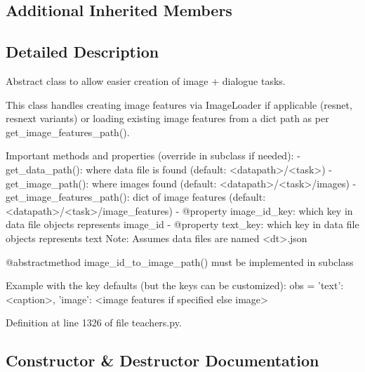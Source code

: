 \subsection*{Additional Inherited Members}


\subsection{Detailed Description}
\begin{DoxyVerb}Abstract class to allow easier creation of image + dialogue tasks.

This class handles creating image features via ImageLoader if applicable
(resnet, resnext variants) or loading existing image features from a dict
path as per get_image_features_path().

Important methods and properties (override in subclass if needed):
- get_data_path(): where data file is found (default: <datapath>/<task>)
- get_image_path(): where images found (default: <datapath>/<task>/images)
- get_image_features_path(): dict of image features (default:
  <datapath>/<task>/image_features)
- @property image_id_key: which key in data file objects represents image_id
- @property text_key: which key in data file objects represents text
Note: Assumes data files are named <dt>.json

@abstractmethod image_id_to_image_path() must be implemented in
subclass

Example with the key defaults (but the keys can be customized):
obs = {'text': <caption>,
    'image': <image features if specified else image>
    }
\end{DoxyVerb}
 

Definition at line 1326 of file teachers.\+py.



\subsection{Constructor \& Destructor Documentation}
\mbox{\label{classparlai_1_1core_1_1teachers_1_1AbstractImageTeacher_aab36cededc1817fee5109293bd62c51d}} 
